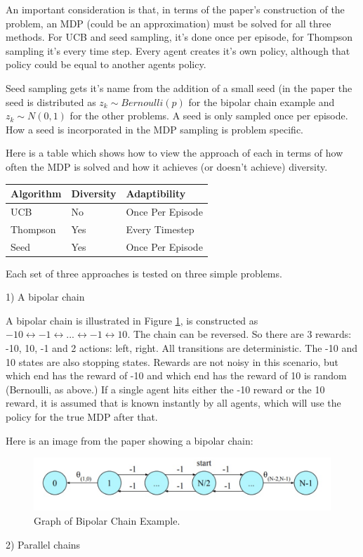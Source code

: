 \documentclass{article}
\begin{document}
An important consideration is that, in terms of the paper's construction of the problem, an MDP (could be an approximation) must be solved for all three methods. For UCB and seed sampling, it's done once per episode, for Thompson sampling it's every time step. Every agent creates it's own policy, although that policy could be equal to another agents policy.

Seed sampling gets it's name from the addition of a small seed (in the paper the seed is distributed as $z_k \sim Bernoulli(p)$ for the bipolar chain example and $z_k \sim N(0,1)$ for the other problems.  A seed is only sampled once per episode. How a seed is incorporated in the MDP sampling is problem specific.

Here is a table which shows how to view the approach of each in terms of how often the MDP is solved and how it achieves (or doesn't achieve) diversity.

\begin{table}[ht]
\centering
\begin{tabular}{|lll|} 
\hline 
Algorithm   & Diversity & Adaptibility \\ 
\hline 
UCB     & No       & Once Per Episode \\ 
Thompson     & Yes      & Every Timestep \\ 
Seed     & Yes       & Once Per Episode \\ 
   \hline
\end{tabular}
\end{table}

Each set of three approaches is tested on three simple problems.

1) A bipolar chain

A bipolar chain is illustrated in Figure \ref{fig:bipolarchain}, is constructed as $-10 \longleftrightarrow -1 \longleftrightarrow ... \longleftrightarrow -1 \longleftrightarrow 10$. The chain can be reversed. So there are 3 rewards: -10, 10, -1 and 2 actions: left, right. All transitions are deterministic. The -10 and 10 states are also stopping states. Rewards are not noisy in this scenario, but which end has the reward of -10 and which end has the reward of 10 is random (Bernoulli, as above.) If a single agent hits either the -10 reward or the 10 reward, it is assumed that is known instantly by all agents, which will use the policy for the true MDP after that. 

Here is an image from the paper showing a bipolar chain:

\begin{figure}[htbp!]
  \centering
\includegraphics[scale=.25]{bipolarchain.png}

  \caption{Graph of Bipolar Chain Example.}
 \label{fig:bipolarchain}
\end{figure}
2) Parallel chains
\end{document}
